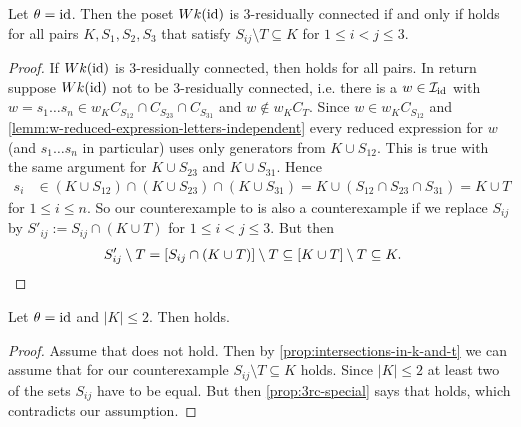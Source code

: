 \begin{prop}
	Let $\theta = \operatorname{id}$. Then the poset $Wk(\operatorname{id})$ is 3-residually connected if and only if  holds for all pairs $K,S_1,S_2,S_3$ that satisfy $S_{ij} \setminus T \subseteq K$ for $1 \leq i < j \leq 3$.

	\begin{proof}
		If $Wk(\operatorname{id})$ is 3-residually connected, then  holds for all pairs. In return suppose $Wk(\operatorname{id})$ not to be 3-residually connected, i.e. there is a $w \in \mathcal{I}_{\operatorname{id}}$ with $w = s_1 \ldots s_n \in w_K C_{S_{12}} \cap C_{S_{23}} \cap C_{S_{31}}$ and $w \notin w_K C_T$. Since $w \in w_K C_{S_{12}}$ and \ref{lemm:w-reduced-expression-letters-independent} every reduced expression for $w$ (and $s_1 \ldots s_n$ in particular) uses only generators from $K \cup S_{12}$. This is true with the same argument for $K \cup S_{23}$ and $K \cup S_{31}$. Hence
		\begin{align*}
			s_i	& \in (K \cup S_{12}) \cap (K \cup S_{23}) \cap (K \cup S_{31}) = K \cup (S_{12} \cap S_{23} \cap S_{31}) = K \cup T
		\end{align*}
		for $1 \leq i \leq n$. So our counterexample to  is also a counterexample if we replace $S_{ij}$ by $S'_{ij} := S_{ij} \cap (K \cup T)$ for $1 \leq i < j \leq 3$. But then
		\begin{align*}
			S'_{ij} \setminus T & = [S_{ij} \cap (K \cup T)] \setminus T \subseteq [K \cup T] \setminus T \subseteq K. \qedhere
		\end{align*}
	\end{proof}
\end{prop}

\begin{coro}
	Let $\theta = \operatorname{id}$ and $|K| \leq 2$. Then  holds.

	\begin{proof}
		Assume that  does not hold. Then by \ref{prop:intersections-in-k-and-t} we can assume that for our counterexample $S_{ij} \setminus T \subseteq K$ holds. Since $|K| \leq 2$ at least two of the sets $S_{ij}$ have to be equal. But then \ref{prop:3rc-special} says that  holds, which contradicts our assumption.
	\end{proof}
\end{coro}